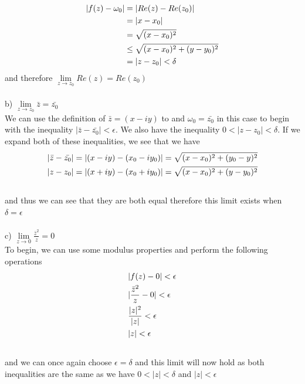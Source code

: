 \documentclass[notitlepage]{article}
\begin{document}
\begin{equation}
    \begin{split}
        |f(z)-\omega_0|  &= |Re(z)-Re(z_0)| \notag\\
                         &= |x-x_0| \\
                         &= \sqrt{(x-x_0)^2} \\
                         &\leq \sqrt{(x-x_0)^2+(y-y_0)^2} \\
                         &= |z-z_0| < \delta \\
    \end{split}
\end{equation}
    and therefore $\lim\limits_{z \to z_0}Re(z)=Re(z_0)$ \\~\\
   b)  $\lim\limits_{z \to z_0}\bar{z}=\bar{z_0}$ \\
    We can use the definition of $\bar{z} = (x-iy)$ to and $\omega_0 = \bar{z_0}$ in this case
    to begin with the inequality $|\bar{z}-\bar{z_0}| < \epsilon$. We also have the inequality
    $0 < | z - z_0| < \delta$. If we expand both of these inequalities, we see that we have
\begin{equation}
    \begin{split}
            |\bar{z}-\bar{z_0}| = |(x-iy)-(x_0-iy_0)|  &= \sqrt{(x-x_0)^2+(y_0-y)^2} \\
            |z - z_0| = |(x+iy)-(x_0+iy_0)| &= \sqrt{(x-x_0)^2+(y-y_0)^2} \\
            \notag
    \end{split}
\end{equation}
    and thus we can see that they are both equal therefore this limit exists when $\delta = \epsilon$\\~\\
    c)  $\lim\limits_{z \to 0}\frac{\bar{z}^2}{z} = 0$ \\
    To begin, we can use some modulus properties and perform the following operations
\begin{equation}
    \begin{split}
        & |f(z)-0| < \epsilon \\
        & |\frac{\bar{z}^2}{z}-0| < \epsilon \\
        & \frac{|z|^2}{|z|}  < \epsilon \\
        & |z| < \epsilon \\
        \notag
    \end{split}
\end{equation}
    and we can once again choose $\epsilon=\delta$ and this limit will now hold as both inequalities are the same
    as we have $0 < |z| < \delta$ and $|z| < \epsilon$
\end{document}

